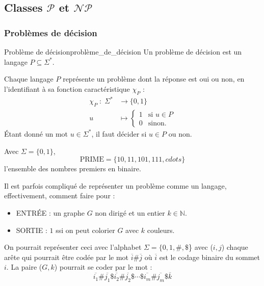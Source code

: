 \subsection{Classes $\mathcal{P}$ et $\mathcal{NP}$}

\subsubsection{Problèmes de décision}
\label{sub:problemes_de_decision}

\begin{definition}{Problème de décision}{problème_de_décision}
  Un problème de décision est un langage $P\subseteq\Sigma^*$.
\end{definition}
\begin{remark}
    Chaque langage $P$ représente un problème dont la réponse est oui ou non, en l'identifiant à sa fonction caractéristique
    $\chi_P$ :
    \begin{equation*}
        \begin{aligned}
            \chi_P\; :\; \Sigma^* &\rightarrow \{0,1\} \\
            u &\mapsto \begin{cases}
                1 & \text{si } u \in P \\
                0 & \text{sinon.}
            \end{cases}
        \end{aligned}
    \end{equation*}
    Étant donné un mot $u\in \Sigma^*$, il faut décider si $u\in P$ ou non.
\end{remark}
\begin{example}
    Avec $\Sigma = \{0,1\}$,
    \begin{equation*}
        \text{PRIME} = \{10,11,101,111,cdots\} 
    \end{equation*}
    l'ensemble des nombres premiers en binaire.
\end{example}
Il est parfois compliqué de représenter un problème comme un langage, effectivement, comment faire pour :
\begin{itemize}[label=\textbullet]
    \item ENTRÉE : un graphe $G$ non dirigé et un entier $k\in\mathbb{N}$.
    \item SORTIE : $1$ ssi on peut colorier $G$ avec $k$ couleurs.
\end{itemize}
On pourrait représenter ceci avec l'alphabet $\Sigma = \{0,1,\#,\$$\} avec ($i,j$) chaque arête qui pourrait être codée par 
le mot $\overline{i}\#\overline{j}$ où $\overline{i}$ est le codage binaire du sommet $i$. La paire ($G,k$) pourrait se 
coder par le mot :
\begin{equation*}
    \overline{i_1}\#\overline{j_1}\$\overline{i_2}\#\overline{j_2}\$\cdots\$\overline{i_m}\#\overline{j_m}\$\overline{k}
\end{equation*}

